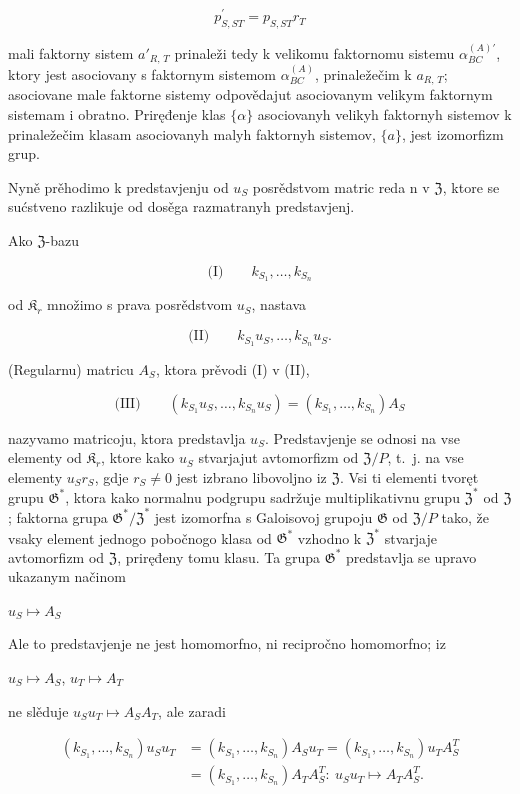 \documentclass[11pt]{article}
\begin{document}
\[p_{S,ST}^{\prime}=p_{S,ST}r_{T}\]

mali faktorny sistem \(a'_{R,\,T}\) prinaleži tedy k velikomu faktornomu sistemu \(\alpha^{(A)\prime}_{BC}\), ktory jest asociovany s faktornym sistemom \(\alpha^{(A)}_{BC}\), prinaležečim k \(a_{R,\,T}\); asociovane male faktorne sistemy odpovědajut asociovanym velikym faktornym sistemam i obratno. Priręđenje klas \(\{\alpha\}\) asociovanyh velikyh faktornyh sistemov k prinaležečim klasam asociovanyh malyh faktornyh sistemov, \(\{a\}\), jest izomorfizm grup.

Nyně prěhodimo k predstavjenju od \(u_S\) posrědstvom matric reda n v \(\mathfrak{Z}\), ktore se sućstveno razlikuje od dosěga razmatranyh predstavjenj.

Ako \(\mathfrak Z\)-bazu

\[
\text{(I)}\qquad k_{S_1}, \ldots, k_{S_n}
\]

od \(\mathfrak K_r\) množimo s prava posrědstvom \(u_S\), nastava

\[
\text{(II)}\qquad k_{S_1}u_S, \ldots, k_{S_n}u_S.
\]

(Regularnu) matricu \(A_S\), ktora prěvodi (I) v (II),

\[
\text{(III)}\qquad (k_{S_1}u_S, \ldots, k_{S_n}u_S) = (k_{S_1}, \ldots, k_{S_n})A_S
\]

nazyvamo matricoju, ktora predstavlja \(u_S\). Predstavjenje se odnosi na vse elementy od \(\mathfrak K_{r}\), ktore kako \(u_S\) stvarjajut avtomorfizm od \(\mathfrak Z/P\), t.~j. na vse elementy \(u_Sr_S\), gdje \(r_S \neq 0\) jest izbrano libovoljno iz \(\mathfrak Z\). Vsi ti elementi tvoręt grupu \(\mathfrak G^*\), ktora kako normalnu podgrupu sadržuje multiplikativnu grupu \(\mathfrak Z^*\) od \(\mathfrak Z\); faktorna grupa \(\mathfrak G^*/\mathfrak Z^*\) jest izomorfna s Galoisovoj grupoju \(\mathfrak G\) od \(\mathfrak Z/P\) tako, že vsaky element jednogo pobočnogo klasa od \(\mathfrak G^*\) vzhodno k \(\mathfrak Z^*\) stvarjaje avtomorfizm od \(\mathfrak Z\), priręđeny tomu klasu. Ta grupa \(\mathfrak G^*\) predstavlja se upravo ukazanym načinom

\(u_S \mapsto A_S\)

Ale to predstavjenje ne jest homomorfno, ni recipročno homomorfno; iz

\(u_S \mapsto A_S\), \(u_T \mapsto A_T\)

ne slěduje \(u_Su_T \mapsto A_SA_T\), ale zaradi

\[
\begin{aligned}
(k_{S_1}, \ldots, k_{S_n})u_Su_T
&=(k_{S_1}, \ldots, k_{S_n})A_Su_T
=(k_{S_1}, \ldots, k_{S_n})u_TA_S^T\\
&=(k_{S_1}, \ldots, k_{S_n})A_TA_S^T:\ u_Su_T\mapsto A_TA_S^T.
\end{aligned}
\]
\end{document}
